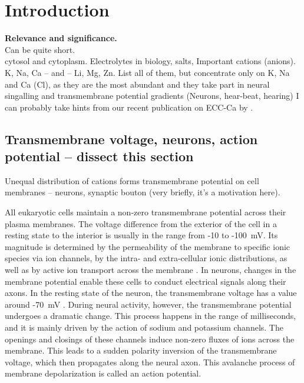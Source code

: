 \chapter*{Introduction}

 \textbf{Relevance and significance.} \\
 Can be quite short. \\
 cytosol and cytoplasm. Electrolytes in biology, salts, Important cations (anions). 
 K, Na, Ca -- and -- Li, Mg, Zn.
 List all of them, but concentrate only on K, Na and Ca (Cl), as they are the most abundant and they take part in neural singalling and transmembrane potential gradients (Neurons, hear-beat, hearing)
 I can probably take hints from our recent publication on ECC-Ca by \citet{martinek17}. 

\section{Transmembrane voltage, neurons, action potential -- dissect this section}

 Unequal distribution of cations forms transmembrane potential on cell membranes -- neurons, synaptic bouton (very briefly, it's a motivation here). 

All eukaryotic cells maintain a non-zero transmembrane potential across their plasma membranes. 
The voltage difference from the exterior of the cell in a resting state to the interior is usually in the range from -10 to -100~mV. \cite{MolBiolCell, sten-knudsen_biological_2002} 
Its magnitude is determined by the permeability of the membrane to specific ionic species via ion channels, by the intra- and extra-cellular ionic distributions, as well as by active ion transport across the membrane  \cite{sten-knudsen_biological_2002}. 
In neurons, changes in the membrane potential enable these cells to conduct electrical signals along their axons.  
In the resting state of the neuron, the transmembrane voltage has a value around -70~mV \cite{sten-knudsen_biological_2002}. 
During neural activity, however, the transmembrane potential undergoes a dramatic change. 
This process happens in the range of milliseconds, and it is mainly driven by the action of sodium and potassium channels. 
The openings and closings of these channels induce non-zero fluxes of ions across the membrane. 
This leads to a sudden polarity inversion of the transmembrane voltage, which then propagates along the neural axon. 
This avalanche process of membrane depolarization is called an action potential. \cite{sten-knudsen_biological_2002}


